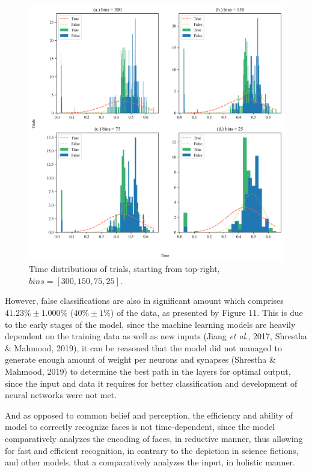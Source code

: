 \documentclass[12pt]{article}
\newcommand{\etl}{\textit{et al.}}
\begin{document}
\begin{figure}[h!]
	\centering
	\includegraphics[width=\textwidth]{fig_3da.png}
	\caption{\doublespacing Time distributions of trials, starting from top-right, $bins = [300, 150, 75, 25]$.\centering}
\end{figure}

However, false classifications are also in significant amount which comprises $41.23\% \pm 1.000\%$ ($40\% \pm 1\%$) of the data, as presented by Figure 11. This is due to the early stages of the model, since the machine learning models are heavily dependent on the training data as well as new inputs (Jiang \etl, 2017, Shrestha \& Mahmood, 2019), it can be reasoned that the model did not managed to generate enough amount of weight per neurons and synapses (Shrestha \& Mahmood, 2019) to determine the best path in the layers for optimal output, since the input and data it requires for better classification and development of neural networks were not met.

And as opposed to common belief and perception, the efficiency and ability of model to correctly recognize faces is not time-dependent, since the model comparatively analyzes the encoding of faces, in reductive manner, thus allowing for fast and efficient recognition, in contrary to the depiction in science fictions, and other models, that a comparatively analyzes the input, in holistic manner.
\end{document}

